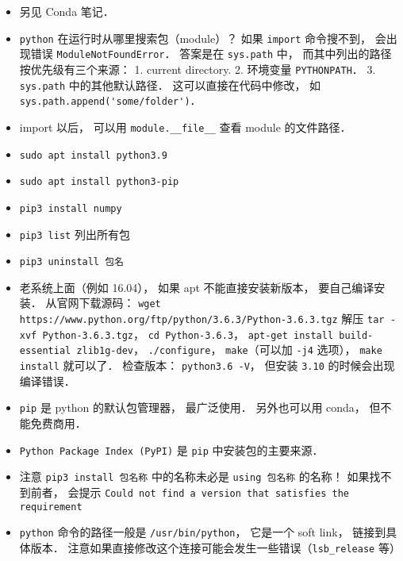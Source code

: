 

\begin{itemize}
\item 另见 Conda 笔记．
\item \verb|python| 在运行时从哪里搜索包（module）？ 如果 \verb|import| 命令搜不到， 会出现错误 \verb|ModuleNotFoundError|． 答案是在 \verb|sys.path| 中， 而其中列出的路径按优先级有三个来源： 1. current directory. 2. 环境变量 \verb|PYTHONPATH|． 3. \verb|sys.path| 中的其他默认路径． 这可以直接在代码中修改， 如 \verb|sys.path.append('some/folder')|．
\item import 以后， 可以用 \verb|module.__file__| 查看 module 的文件路径．
\item \verb|sudo apt install python3.9|
\item \verb|sudo apt install python3-pip|
\item \verb|pip3 install numpy|
\item \verb|pip3 list| 列出所有包
\item \verb|pip3 uninstall 包名|
\item 老系统上面（例如 16.04）， 如果 apt 不能直接安装新版本， 要自己编译安装． 从官网下载源码： \verb|wget https://www.python.org/ftp/python/3.6.3/Python-3.6.3.tgz| 解压 \verb|tar -xvf Python-3.6.3.tgz|， \verb|cd Python-3.6.3|， \verb|apt-get install build-essential zlib1g-dev|， \verb|./configure|， \verb|make|（可以加 \verb|-j4| 选项）， \verb|make install| 就可以了． 检查版本： \verb|python3.6 -V|， 但安装 \verb|3.10| 的时候会出现编译错误．
\item \verb|pip| 是 python 的默认包管理器， 最广泛使用． 另外也可以用 conda， 但不能免费商用．
\item \verb|Python Package Index (PyPI)| 是 \verb|pip| 中安装包的主要来源．
\item 注意 \verb|pip3 install 包名称| 中的名称未必是 \verb|using 包名称| 的名称！ 如果找不到前者， 会提示 \verb|Could not find a version that satisfies the requirement|
\item \verb|python| 命令的路径一般是 \verb|/usr/bin/python|， 它是一个 soft link， 链接到具体版本． 注意如果直接修改这个连接可能会发生一些错误（\verb|lsb_release| 等）
\end{itemize}
